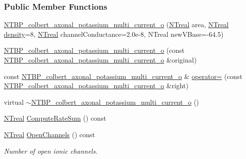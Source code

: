 \subsubsection*{Public Member Functions}
\begin{DoxyCompactItemize}
\item 
\hyperlink{class_n_t_b_p__colbert__axonal__potassium__multi__current__o_a7ac652297165eef2a699d506df53fe9e}{NTBP\_\-colbert\_\-axonal\_\-potassium\_\-multi\_\-current\_\-o} (\hyperlink{nt__types_8h_a814a97893e9deb1eedcc7604529ba80d}{NTreal} area, \hyperlink{nt__types_8h_a814a97893e9deb1eedcc7604529ba80d}{NTreal} \hyperlink{class_n_t_b_p__multi__current__o_a82138baaa276b09c13038ca1fd6f08a7}{density}=8, \hyperlink{nt__types_8h_a814a97893e9deb1eedcc7604529ba80d}{NTreal} channelConductance=2.0e-\/8, NTreal newVBase=-\/64.5)
\item 
\hyperlink{class_n_t_b_p__colbert__axonal__potassium__multi__current__o_afaf5d036c07f588fb7dbe53f5d38a768}{NTBP\_\-colbert\_\-axonal\_\-potassium\_\-multi\_\-current\_\-o} (const \hyperlink{class_n_t_b_p__colbert__axonal__potassium__multi__current__o}{NTBP\_\-colbert\_\-axonal\_\-potassium\_\-multi\_\-current\_\-o} \&original)
\item 
const \hyperlink{class_n_t_b_p__colbert__axonal__potassium__multi__current__o}{NTBP\_\-colbert\_\-axonal\_\-potassium\_\-multi\_\-current\_\-o} \& \hyperlink{class_n_t_b_p__colbert__axonal__potassium__multi__current__o_a7ad7baf8cf14ed76be814a60aeb0c640}{operator=} (const \hyperlink{class_n_t_b_p__colbert__axonal__potassium__multi__current__o}{NTBP\_\-colbert\_\-axonal\_\-potassium\_\-multi\_\-current\_\-o} \&right)
\item 
virtual \hyperlink{class_n_t_b_p__colbert__axonal__potassium__multi__current__o_a57040c72f4790fb590d586167db43ad7}{$\sim$NTBP\_\-colbert\_\-axonal\_\-potassium\_\-multi\_\-current\_\-o} ()
\item 
\hyperlink{nt__types_8h_a814a97893e9deb1eedcc7604529ba80d}{NTreal} \hyperlink{class_n_t_b_p__colbert__axonal__potassium__multi__current__o_a391e3787c6ad9b049203f05961b3a434}{ComputeRateSum} () const 
\item 
\hyperlink{nt__types_8h_a814a97893e9deb1eedcc7604529ba80d}{NTreal} \hyperlink{class_n_t_b_p__colbert__axonal__potassium__multi__current__o_a77ec4b054732b32aff4554dc73f307c7}{OpenChannels} () const 
\begin{DoxyCompactList}\small\item\em Number of open ionic channels. \item\end{DoxyCompactList}\item 

\end{DoxyCompactItemize}
